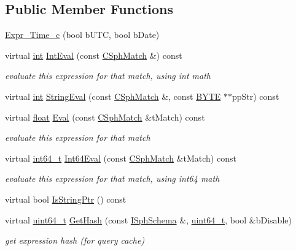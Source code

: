 \subsection*{Public Member Functions}
\begin{DoxyCompactItemize}
\item 
\hyperlink{structExpr__Time__c_a7871212c6179427eea712cafbe8c52ef}{Expr\-\_\-\-Time\-\_\-c} (bool b\-U\-T\-C, bool b\-Date)
\item 
virtual \hyperlink{sphinxexpr_8cpp_a4a26e8f9cb8b736e0c4cbf4d16de985e}{int} \hyperlink{structExpr__Time__c_abb3cfcd43114bf424fafbb069ee76504}{Int\-Eval} (const \hyperlink{classCSphMatch}{C\-Sph\-Match} \&) const 
\begin{DoxyCompactList}\small\item\em evaluate this expression for that match, using int math \end{DoxyCompactList}\item 
virtual \hyperlink{sphinxexpr_8cpp_a4a26e8f9cb8b736e0c4cbf4d16de985e}{int} \hyperlink{structExpr__Time__c_a4502eb063d3f7c90f839a8d3a73ba5c1}{String\-Eval} (const \hyperlink{classCSphMatch}{C\-Sph\-Match} \&, const \hyperlink{sphinxstd_8h_a4ae1dab0fb4b072a66584546209e7d58}{B\-Y\-T\-E} $\ast$$\ast$pp\-Str) const 
\item 
virtual \hyperlink{sphinxexpr_8cpp_a0e0d0739f7035f18f949c2db2c6759ec}{float} \hyperlink{structExpr__Time__c_ac2815438ac8d2868d4a679c475f30c70}{Eval} (const \hyperlink{classCSphMatch}{C\-Sph\-Match} \&t\-Match) const 
\begin{DoxyCompactList}\small\item\em evaluate this expression for that match \end{DoxyCompactList}\item 
virtual \hyperlink{sphinxstd_8h_a996e72f71b11a5bb8b3b7b6936b1516d}{int64\-\_\-t} \hyperlink{structExpr__Time__c_a11aa3c8971ce7d870a0a44a1b9f32eb6}{Int64\-Eval} (const \hyperlink{classCSphMatch}{C\-Sph\-Match} \&t\-Match) const 
\begin{DoxyCompactList}\small\item\em evaluate this expression for that match, using int64 math \end{DoxyCompactList}\item 
virtual bool \hyperlink{structExpr__Time__c_ab0353ba47ee4b25bb1fd5a1b0abcf6b7}{Is\-String\-Ptr} () const 
\item 
virtual \hyperlink{sphinxstd_8h_aaa5d1cd013383c889537491c3cfd9aad}{uint64\-\_\-t} \hyperlink{structExpr__Time__c_af9df90862e3d25e032d0b6df9806882d}{Get\-Hash} (const \hyperlink{classISphSchema}{I\-Sph\-Schema} \&, \hyperlink{sphinxstd_8h_aaa5d1cd013383c889537491c3cfd9aad}{uint64\-\_\-t}, bool \&b\-Disable)
\begin{DoxyCompactList}\small\item\em get expression hash (for query cache) \end{DoxyCompactList}\end{DoxyCompactItemize}

